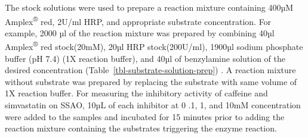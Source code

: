 \documentclass[
  letterpaper,
  DIV=11,
  numbers=noendperiod]{scrreprt}
\begin{document}
The stock solutions were used to prepare a reaction mixture containing
400µM Amplex\textsuperscript{®} red, 2U/ml HRP, and appropriate
substrate concentration. For example, 2000 µl of the reaction mixture
was prepared by combining 40µl Amplex\textsuperscript{®} red
stock(20mM), 20µl HRP stock(200U/ml), 1900µl sodium phosphate buffer (pH
7.4) (1X reaction buffer), and 40µl of benzylamine solution of the
desired concentration (Table~\ref{tbl-substrate-solution-prep}) . A
reaction mixture without substrate was prepared by replacing the
substrate with same volume of 1X reaction buffer. For measuring the
inhibitory activity of caffeine and simvastatin on SSAO, 10µL of each
inhibitor at 0 .1, 1, and 10mM concentration were added to the samples
and incubated for 15 minutes prior to adding the reaction mixture
containing the substrates triggering the enzyme reaction.
\end{document}
